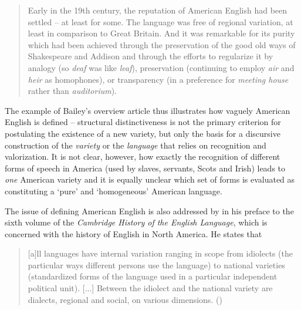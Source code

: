 \begin{quote}
Early in the 19th century, the reputation of American English had been settled – at least for some. The language was free of regional variation, at least in comparison to Great Britain. And it was remarkable for its purity which had been achieved through the preservation of the good old ways of Shakespeare and Addison and through the efforts to regularize it by analogy (so \emph{deaf} was like \emph{leaf}), preservation (continuing to employ \emph{air} and \emph{heir} as homophones), or transparency (in a preference for \emph{meeting house} rather than \emph{auditorium}).
\end{quote}


The example of Bailey’s overview article thus illustrates how vaguely American English is defined – structural distinctiveness is not the primary criterion for postulating the existence of a new variety, but only the basis for a discursive construction of the \textit{variety} or the \textit{language} that relies on recognition and valorization. It is not clear, however, how exactly the recognition of different forms of speech in America (used by slaves, servants, Scots and Irish) leads to \emph{one} American variety and it is equally unclear which set of forms is evaluated as constituting a ‘pure’ and ‘homogeneous’ American language.


The issue of defining American English is also addressed by \citet{Algeo2001b} in his preface to the sixth volume of the \emph{Cambridge History of the English Language}, which is concerned with the history of English in North America. He states that

\begin{quote}
[a]ll languages have internal variation ranging in scope from idiolects (the particular ways different persons use the language) to national varieties (standardized forms of the language used in a particular independent political unit). [...] Between the idiolect and the national variety are dialects, regional and social, on various dimensions. (\citeyear[xviii]{Algeo2001b})
\end{quote}

